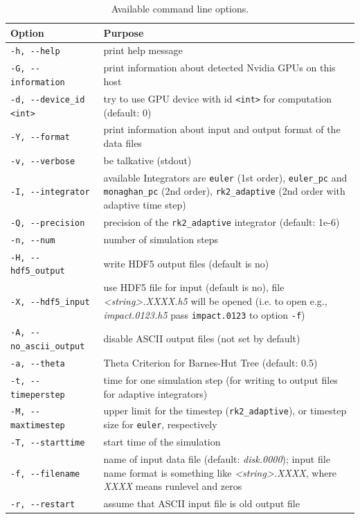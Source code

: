 \documentclass[10pt,fleqn,twoside]{article}
\begin{document}
\begin{table}
\centering
\caption{Available command line options.}
\begin{tabular}[b]{p{5cm} p{9cm}}
\hline
Option	&	Purpose		\\
\hline
\verb|-h, --help|			&	print help message	\\
\verb|-G, --information|	&	print information about detected Nvidia GPUs on this host	\\
\verb|-d, --device_id <int>|	&	try to use GPU device with id \verb|<int>| for computation (default: 0)	\\
\verb|-Y, --format|	&	print information about input and output format of the data files	\\
\verb|-v, --verbose|	&	be talkative (stdout)	\\
\verb|-I, --integrator|	&	available Integrators are \verb|euler| (1st order), \verb|euler_pc| and \verb|monaghan_pc| (2nd order), \verb|rk2_adaptive| (2nd order with adaptive time step)	\\
\verb|-Q, --precision|		&	precision of the \verb|rk2_adaptive| integrator (default: 1e-6)	\\
\verb|-n, --num|	&	number of simulation steps	\\
\verb|-H, --hdf5_output|	&	write HDF5 output files (default is no)	\\
\verb|-X, --hdf5_input|   	&	use HDF5 file for input (default is no), file \emph{<string>.XXXX.h5} will be opened (i.e. to open e.g., \emph{impact.0123.h5} pass \verb|impact.0123| to option \verb|-f|)	\\
\verb|-A, --no_ascii_output|	&	disable ASCII output files (not set by default)	\\
\verb|-a, --theta|		&	Theta Criterion for Barnes-Hut Tree (default: 0.5)	\\
\verb|-t, --timeperstep|	&	time for one simulation step (for writing to output files for adaptive integrators)		\\
\verb|-M, --maxtimestep|  &		upper limit for the timestep (\verb|rk2_adaptive|), or timestep size for \verb|euler|, respectively	\\
\verb|-T, --starttime|		&	start time of the simulation	\\
\verb|-f, --filename|		&	name of input data file (default: \emph{disk.0000}); input file name format is something like \emph{<string>.XXXX}, where \emph{XXXX} means runlevel and zeros	\\
\verb|-r, --restart|		&	assume that ASCII input file is old output file	\\

\end{tabular}
\end{table}
\end{document}
